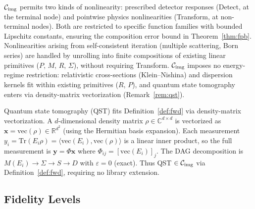 \documentclass[11pt]{article}
\begin{document}
\begin{remark}
\label{rem:nonlin}
$\mathcal{C}_{\mathrm{img}}$ permits two kinds of nonlinearity: prescribed detector responses (Detect, at the terminal node) and pointwise physics nonlinearities (Transform, at non-terminal nodes). Both are restricted to specific function families with bounded Lipschitz constants, ensuring the composition error bound in Theorem~\ref{thm:fpb}. Nonlinearities arising from self-consistent iteration (multiple scattering, Born series) are handled by unrolling into finite compositions of existing linear primitives ($P$, $M$, $R$, $\Sigma$), without requiring Transform. $\mathcal{C}_{\mathrm{img}}$ imposes no energy-regime restriction: relativistic cross-sections (Klein--Nishina) and dispersion kernels fit within existing primitives ($R$, $P$), and quantum state tomography enters via density-matrix vectorization (Remark~\ref{rem:qst}).
\end{remark}

\begin{remark}
\label{rem:qst}
Quantum state tomography (QST) fits Definition~\ref{def:fwd} via density-matrix vectorization. A $d$-dimensional density matrix $\rho \in \mathbb{C}^{d \times d}$ is vectorized as $\mathbf{x} = \mathrm{vec}(\rho) \in \mathbb{R}^{d^2}$ (using the Hermitian basis expansion). Each measurement $y_i = \mathrm{Tr}(E_i \rho) = \langle \mathrm{vec}(E_i), \mathrm{vec}(\rho) \rangle$ is a linear inner product, so the full measurement is $\mathbf{y} = \Phi \mathbf{x}$ where $\Phi_{ij} = [\mathrm{vec}(E_i)]_j$. The DAG decomposition is $M(E_i) \to \Sigma \to S \to D$ with $\varepsilon = 0$ (exact). Thus QST $\in \mathcal{C}_{\mathrm{img}}$ via Definition~\ref{def:fwd}, requiring no library extension.
\end{remark}

\subsection{Fidelity Levels}
\end{document}
